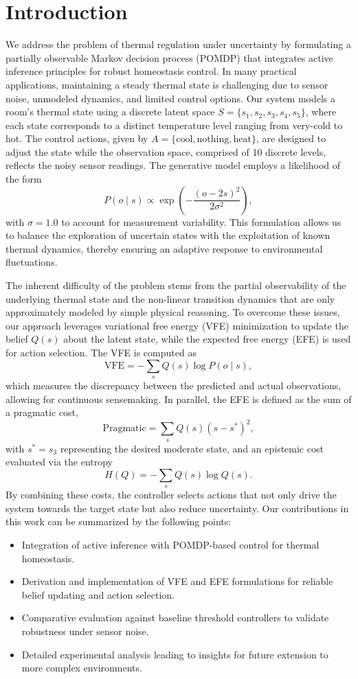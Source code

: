 \documentclass[11pt]{article}
\begin{document}
\section{Introduction}
We address the problem of thermal regulation under uncertainty by formulating a partially observable Markov decision process (POMDP) that integrates active inference principles for robust homeostasis control. In many practical applications, maintaining a steady thermal state is challenging due to sensor noise, unmodeled dynamics, and limited control options. Our system models a room’s thermal state using a discrete latent space \(S=\{s_1, s_2, s_3, s_4, s_5\}\), where each state corresponds to a distinct temperature level ranging from very-cold to hot. The control actions, given by \(A=\{\text{cool}, \text{nothing}, \text{heat}\}\), are designed to adjust the state while the observation space, comprised of 10 discrete levels, reflects the noisy sensor readings. The generative model employs a likelihood of the form 
\[
P(o\mid s) \propto \exp\left(-\frac{(o-2s)^2}{2\sigma^2}\right),
\]
with \(\sigma=1.0\) to account for measurement variability. This formulation allows us to balance the exploration of uncertain states with the exploitation of known thermal dynamics, thereby ensuring an adaptive response to environmental fluctuations.

The inherent difficulty of the problem stems from the partial observability of the underlying thermal state and the non-linear transition dynamics that are only approximately modeled by simple physical reasoning. To overcome these issues, our approach leverages variational free energy (VFE) minimization to update the belief \(Q(s)\) about the latent state, while the expected free energy (EFE) is used for action selection. The VFE is computed as
\[
\text{VFE} = -\sum_{s} Q(s) \log P(o\mid s),
\]
which measures the discrepancy between the predicted and actual observations, allowing for continuous sensemaking. In parallel, the EFE is defined as the sum of a pragmatic cost,
\[
\text{Pragmatic} = \sum_{s} Q(s)(s-s^*)^2,
\]
with \(s^*=s_3\) representing the desired moderate state, and an epistemic cost evaluated via the entropy
\[
H(Q) = -\sum_{s} Q(s)\log Q(s).
\]
By combining these costs, the controller selects actions that not only drive the system towards the target state but also reduce uncertainty. Our contributions in this work can be summarized by the following points:
\begin{itemize}
    \item Integration of active inference with POMDP-based control for thermal homeostasis.
    \item Derivation and implementation of VFE and EFE formulations for reliable belief updating and action selection.
    \item Comparative evaluation against baseline threshold controllers to validate robustness under sensor noise.
    \item Detailed experimental analysis leading to insights for future extension to more complex environments.
\end{itemize}
\end{document}
